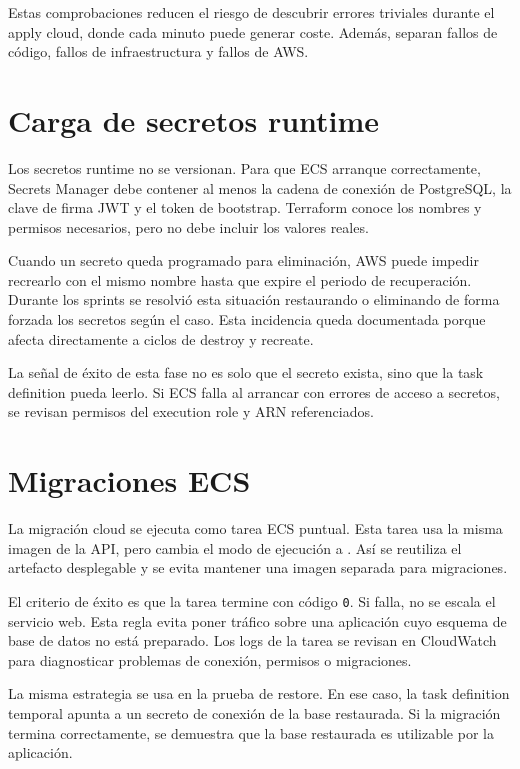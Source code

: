 Estas comprobaciones reducen el riesgo de descubrir errores triviales durante el apply cloud, donde cada minuto puede generar coste. Además, separan fallos de código, fallos de infraestructura y fallos de AWS.

\section{Carga de secretos runtime}
\label{sec:anexo-secretos}

Los secretos runtime no se versionan. Para que ECS arranque correctamente, Secrets Manager debe contener al menos la cadena de conexión de PostgreSQL, la clave de firma JWT y el token de bootstrap. Terraform conoce los nombres y permisos necesarios, pero no debe incluir los valores reales.

Cuando un secreto queda programado para eliminación, AWS puede impedir recrearlo con el mismo nombre hasta que expire el periodo de recuperación. Durante los sprints se resolvió esta situación restaurando o eliminando de forma forzada los secretos según el caso. Esta incidencia queda documentada porque afecta directamente a ciclos de destroy y recreate.

La señal de éxito de esta fase no es solo que el secreto exista, sino que la task definition pueda leerlo. Si ECS falla al arrancar con errores de acceso a secretos, se revisan permisos del execution role y ARN referenciados.

\section{Migraciones ECS}
\label{sec:anexo-migraciones}

La migración cloud se ejecuta como tarea ECS puntual. Esta tarea usa la misma imagen de la API, pero cambia el modo de ejecución a . Así se reutiliza el artefacto desplegable y se evita mantener una imagen separada para migraciones.

El criterio de éxito es que la tarea termine con código \texttt{0}. Si falla, no se escala el servicio web. Esta regla evita poner tráfico sobre una aplicación cuyo esquema de base de datos no está preparado. Los logs de la tarea se revisan en CloudWatch para diagnosticar problemas de conexión, permisos o migraciones.

La misma estrategia se usa en la prueba de restore. En ese caso, la task definition temporal apunta a un secreto de conexión de la base restaurada. Si la migración termina correctamente, se demuestra que la base restaurada es utilizable por la aplicación.

